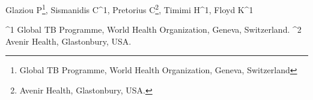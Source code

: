 Glaziou P\footnote[1]{Global TB Programme, World Health Organization, Geneva, Switzerland}, Sismanidis C^1, Pretorius C\footnote{Avenir Health, Glastonbury, USA.}, Timimi H^1, Floyd K^1

^1 Global TB Programme, World Health Organization, Geneva, Switzerland.
^2 Avenir Health, Glastonbury, USA.
  